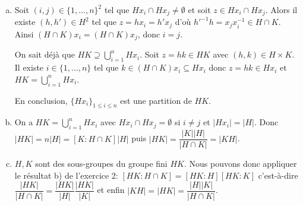 \begin{enumerate}[a)]
  \item Soit $(i,j)\in\{1,\dots,n\}^2$ tel que $Hx_i\cap Hx_j\neq\emptyset$ et
    soit $z\in Hx_i\cap Hx_j$. Alors il existe $(h,h')\in H^2$ tel que
    $z=hx_i=h'x_j$ d'où $h'^{-1}h=x_jx_i^{-1}\in H\cap K$. Ainsi $(H\cap
    K)x_i=(H\cap K)x_j$, donc $i=j$.  
    
    On sait déjà que $HK\supseteq\bigcup_{i=1}^{n} Hx_i$. Soit $z=hk\in HK$ avec
    $(h,k)\in H\times K$.  Il existe $i\in \{1,\dots,n\}$ tel que $k\in
    (H\cap K)x_i\subseteq Hx_i$ donc $z=hk\in Hx_i$ et
    $HK=\bigcup_{i=1}^n Hx_i$. 
    
    En conclusion, $\{Hx_i\}_{1\leqslant i\leqslant n}$ est une partition de
    $HK$.

  \item On a $HK=\bigcup_{i=1}^{n} Hx_i$ avec $Hx_i\cap Hx_j=\emptyset$ si
    $i\neq j$ et $|Hx_i|=|H|$. Donc $|HK|=n|H|=[K\colon H\cap K]|H|$ puis
    $|HK|=\dfrac{|K||H|}{|H\cap K|}=|KH|$.

  \item $H, K$ sont des sous-groupes du groupe fini $HK$. Nous pouvons donc
    appliquer le résultat b) de l'exercice 2: 
    $[HK\colon H\cap K]=[HK\colon H][HK\colon K]$ c'est-à-dire 
    $\dfrac{|HK|}{|H\cap K|}=\dfrac{|HK|}{|H|}\dfrac{|HK|}{|K|}$ 
    et enfin $|KH|=|HK|=\dfrac{|H||K|}{|H\cap K|}$.
\end{enumerate}


